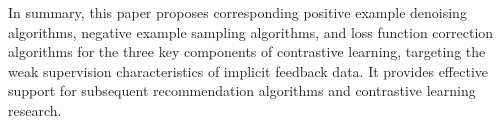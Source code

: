 {	In summary, this paper proposes corresponding positive example denoising algorithms, negative example sampling algorithms, and loss function correction algorithms for the three key components of contrastive learning, targeting the weak supervision characteristics of implicit feedback data. It provides effective support for subsequent recommendation algorithms and contrastive learning research. }

